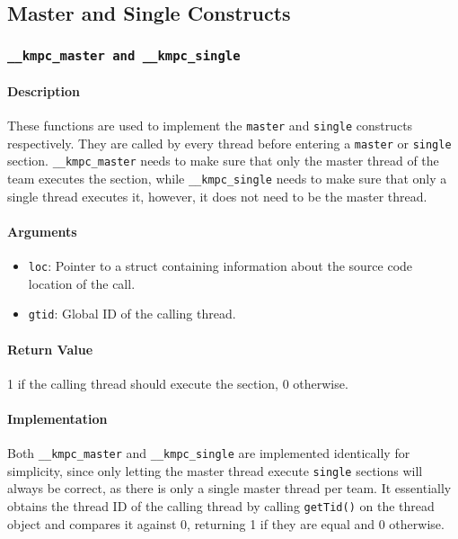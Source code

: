 \subsection{Master and Single Constructs}

\subsubsection{\texttt{__kmpc_master and __kmpc_single}}

\paragraph{Description} These functions are used to implement the \texttt{master} and
\texttt{single} constructs respectively. They are called by every thread before entering a
\texttt{master} or \texttt{single} section. \texttt{\_\_kmpc\_master} needs to make sure that only
the master thread of the team executes the section, while \texttt{\_\_kmpc\_single} needs to make
sure that only a single thread executes it, however, it does not need to be the master thread.

\paragraph{Arguments}
\begin{itemize}
	\item \texttt{loc}: Pointer to a struct containing information about the source code location
	      of the call.
	\item \texttt{gtid}: Global ID of the calling thread.
\end{itemize}

\paragraph{Return Value} 1 if the calling thread should execute the section, 0 otherwise.

\paragraph{Implementation} Both \texttt{\_\_kmpc\_master} and \texttt{\_\_kmpc\_single} are
implemented identically for simplicity, since only letting the master thread execute \texttt{single}
sections will always be correct, as there is only a single master thread per team. It essentially
obtains the thread ID of the calling thread by calling \texttt{getTid()} on the thread object and
compares it against 0, returning 1 if they are equal and 0 otherwise.

